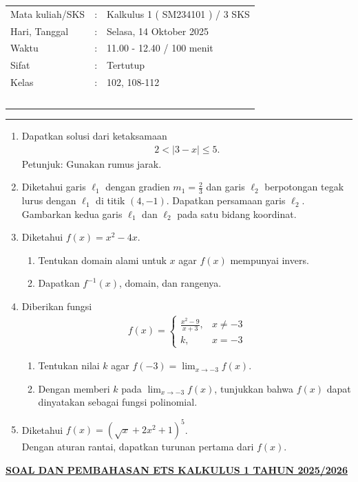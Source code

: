 \documentclass[10pt,openany,a4paper]{article}
\theoremstyle{definition}
\theoremstyle{definition}
\theoremstyle{plain}
\begin{document}
    \begin{center}
	\begin{tabular}{lcl}
		Mata kuliah/SKS & : & Kalkulus 1 ( SM234101 ) / 3 SKS\\
		Hari, Tanggal & : & Selasa, 14 Oktober 2025\\
		Waktu & : & 11.00 - 12.40 / 100 menit\\
		Sifat & : & Tertutup\\
		Kelas & : & 102, 108-112\\
  ~
	\end{tabular}
    
    \noindent\rule{\textwidth}{2.pt}
        \end{center}
        \begin{enumerate}
            \item Dapatkan solusi dari ketaksamaan 
            \begin{align*}
                2<|3-x|\leq 5.
            \end{align*}
            Petunjuk: Gunakan rumus jarak.
            \item Diketahui garis $\ell_1$ dengan gradien $m_1=\frac{2}{3}$ dan garis $\ell_2$ berpotongan tegak lurus dengan $\ell_1$ di titik $(4,-1)$. Dapatkan persamaan garis $\ell_2$. \\
            Gambarkan kedua garis $\ell_1$ dan $\ell_2$ pada satu bidang koordinat. 
            \item Diketahui $f(x)=x^2-4x$.
            \begin{enumerate}
                \item Tentukan domain alami untuk $x$ agar $f(x)$ mempunyai invers.
                \item Dapatkan $f^{-1}(x)$, domain, dan rangenya. 
            \end{enumerate}
            \item Diberikan fungsi 
            \begin{align*}
                f(x)=\begin{cases}
                    \frac{x^2-9}{x+3}, &x\neq -3\\
                    k, &x=-3
                \end{cases}
            \end{align*}
            \begin{enumerate}
                \item Tentukan nilai $k$ agar $f(-3)=\displaystyle\lim_{x\to -3} f(x)$.
                \item Dengan memberi $k$ pada $\lim_{x\to-3} f(x)$, tunjukkan bahwa $f(x)$ dapat dinyatakan sebagai fungsi polinomial. 
            \end{enumerate}
            \item Diketahui $f(x)=(\sqrt{x}+2x^2+1)^5$.\\
            Dengan aturan rantai, dapatkan turunan pertama dari $f(x)$.
        \end{enumerate}
               \newpage
 \begin{center}
	{\underline{\textbf{\MakeUppercase{Soal dan Pembahasan ETS Kalkulus 1 Tahun 2025/2026}}}}
    \end{center}
\end{document}
